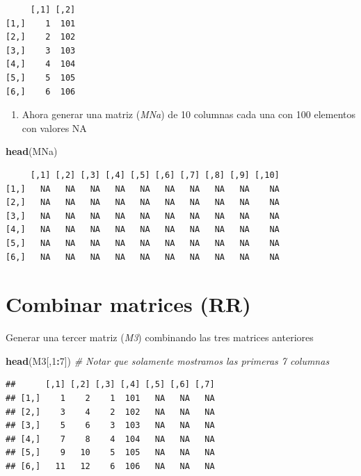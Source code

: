 \documentclass[]{book}
\newenvironment{Shaded}{\begin{snugshade}}{\end{snugshade}}
\newcommand{\CommentTok}[1]{\textcolor[rgb]{0.56,0.35,0.01}{\textit{#1}}}
\newcommand{\DecValTok}[1]{\textcolor[rgb]{0.00,0.00,0.81}{#1}}
\newcommand{\KeywordTok}[1]{\textcolor[rgb]{0.13,0.29,0.53}{\textbf{#1}}}
\newcommand{\NormalTok}[1]{#1}
\newcommand{\OperatorTok}[1]{\textcolor[rgb]{0.81,0.36,0.00}{\textbf{#1}}}
\providecommand{\tightlist}{%
  \setlength{\itemsep}{0pt}\setlength{\parskip}{0pt}}
\begin{document}
\begin{verbatim}
     [,1] [,2]
[1,]    1  101
[2,]    2  102
[3,]    3  103
[4,]    4  104
[5,]    5  105
[6,]    6  106
\end{verbatim}

\begin{enumerate}
\def\labelenumi{\arabic{enumi}.}
\setcounter{enumi}{1}
\tightlist
\item
  Ahora generar una matriz (\emph{MNa}) de 10 columnas cada una con 100 elementos con valores NA
\end{enumerate}

\begin{Shaded}
\begin{Highlighting}[]
\KeywordTok{head}\NormalTok{(MNa)}
\end{Highlighting}
\end{Shaded}

\begin{verbatim}
     [,1] [,2] [,3] [,4] [,5] [,6] [,7] [,8] [,9] [,10]
[1,]   NA   NA   NA   NA   NA   NA   NA   NA   NA    NA
[2,]   NA   NA   NA   NA   NA   NA   NA   NA   NA    NA
[3,]   NA   NA   NA   NA   NA   NA   NA   NA   NA    NA
[4,]   NA   NA   NA   NA   NA   NA   NA   NA   NA    NA
[5,]   NA   NA   NA   NA   NA   NA   NA   NA   NA    NA
[6,]   NA   NA   NA   NA   NA   NA   NA   NA   NA    NA
\end{verbatim}

\hypertarget{combinar-matrices-rr}{%
\section{Combinar matrices (RR)}\label{combinar-matrices-rr}}

Generar una tercer matriz (\emph{M3}) combinando las tres matrices anteriores

\begin{Shaded}
\begin{Highlighting}[]
\KeywordTok{head}\NormalTok{(M3[,}\DecValTok{1}\OperatorTok{:}\DecValTok{7}\NormalTok{]) }\CommentTok{# Notar que solamente mostramos las primeras 7 columnas}
\end{Highlighting}
\end{Shaded}

\begin{verbatim}
##      [,1] [,2] [,3] [,4] [,5] [,6] [,7]
## [1,]    1    2    1  101   NA   NA   NA
## [2,]    3    4    2  102   NA   NA   NA
## [3,]    5    6    3  103   NA   NA   NA
## [4,]    7    8    4  104   NA   NA   NA
## [5,]    9   10    5  105   NA   NA   NA
## [6,]   11   12    6  106   NA   NA   NA
\end{verbatim}
\end{document}
